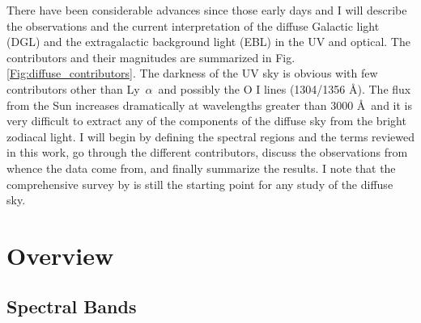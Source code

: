 \documentclass{iau}
\newcommand{\lya}{Ly~$\alpha$}
\begin{document}
There have been considerable advances since those early days \citep{Murthy2009} and I will describe the observations and the current  interpretation of the diffuse Galactic light (DGL) and the extragalactic background light (EBL) in the UV and optical. The contributors and their magnitudes are summarized in Fig. \ref{Fig:diffuse_contributors}. The darkness of the UV sky is obvious with few contributors other than \lya\ and possibly the O I lines (1304/1356 \AA). The flux from the Sun increases dramatically at wavelengths greater than 3000 \AA\ and it is very difficult to extract any of the components of the diffuse sky from the bright zodiacal light. I will begin by defining the spectral regions and the terms reviewed in this work, go through the different contributors, discuss the observations from whence the data come from, and finally summarize the results. I note that the comprehensive survey by \citet{Leinert1998} is still the starting point for any study of the diffuse sky.

\section{Overview}
\subsection{Spectral Bands}
\end{document}
